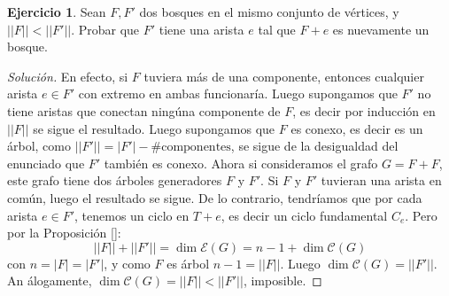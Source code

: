 \documentclass[12pt]{report}
\theoremstyle{plain}
\theoremstyle{definition}
\newtheorem{exercise}[theorem]{Ejercicio}
\newenvironment{solution}{\begin{proof}[Solución]}{\end{proof}}
\newcommand{\abs}[1]{\left \vert #1 \right \vert}
\newcommand{\Abs}[1]{\left \vert \left \vert #1 \right \vert \right \vert}
\begin{document}
\begin{exercise}
Sean $F,F'$ dos bosques en el mismo conjunto de vértices, y $\Abs F < \Abs  {F'}$. Probar que $F'$ tiene una arista $
e$ tal que $F + e$ es nuevamente un bosque.
\end{exercise}
\begin{solution}
    En efecto, si $F$ tuviera más de una componente, entonces cualquier arista $e \in F'$ con extremo en ambas
    funcionaría. Luego supongamos que $F'$ no tiene aristas que conectan ningúna componente de $F$, es decir por
    inducción en $\Abs F$ se sigue el resultado. Luego supongamos que $F$ es conexo, es decir es un árbol, como $\Abs {F'} = \abs {F'}- \# \text{componentes}$, se sigue de la desigualdad del enunciado que $F'$ también es conexo. Ahora si consideramos el grafo $G = F + F$, este grafo tiene dos árboles generadores $F$ y $F'$. Si $F$ y $F'$ tuvieran una arista en común, luego el resultado se sigue. De lo contrario, tendríamos que por cada arista $e \in F'$, tenemos un ciclo en $T+e$, es decir un ciclo fundamental $C_e$. Pero por la Proposición \ref{}:
    \[
    \Abs F + \Abs {F'} = \dim \mathcal E (G) = n -1 + \dim \mathcal C (G)
    \]
    con $n = \abs F = \abs {F'}$, y como $F$ es árbol $n-1 = \Abs F$. Luego $\dim \mathcal C (G) = \Abs {F'}$. An
    álogamente, $\dim \mathcal C (G) = \Abs {F} < \Abs {F'}$, imposible.
\end{solution}
\end{document}
